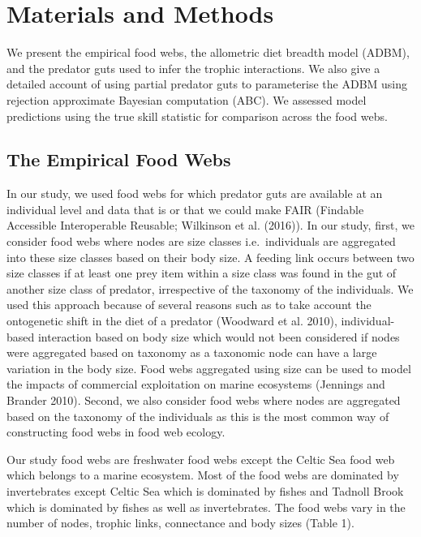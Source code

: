 \documentclass{article}
\begin{document}
\hypertarget{materials-and-methods}{%
\section{Materials and Methods}\label{materials-and-methods}}

We present the empirical food webs, the allometric diet breadth model
(ADBM), and the predator guts used to infer the trophic interactions. We
also give a detailed account of using partial predator guts to
parameterise the ADBM using rejection approximate Bayesian computation
(ABC). We assessed model predictions using the true skill statistic for
comparison across the food webs.

\hypertarget{the-empirical-food-webs}{%
\subsection{The Empirical Food Webs}\label{the-empirical-food-webs}}

In our study, we used food webs for which predator guts are available at
an individual level and data that is or that we could make FAIR
(Findable Accessible Interoperable Reusable; Wilkinson et al. (2016)).
In our study, first, we consider food webs where nodes are size classes
i.e.~individuals are aggregated into these size classes based on their
body size. A feeding link occurs between two size classes if at least
one prey item within a size class was found in the gut of another size
class of predator, irrespective of the taxonomy of the individuals. We
used this approach because of several reasons such as to take account
the ontogenetic shift in the diet of a predator (Woodward et al. 2010),
individual-based interaction based on body size which would not been
considered if nodes were aggregated based on taxonomy as a taxonomic
node can have a large variation in the body size. Food webs aggregated
using size can be used to model the impacts of commercial exploitation
on marine ecosystems (Jennings and Brander 2010). Second, we also
consider food webs where nodes are aggregated based on the taxonomy of
the individuals as this is the most common way of constructing food webs
in food web ecology.

Our study food webs are freshwater food webs except the Celtic Sea food
web which belongs to a marine ecosystem. Most of the food webs are
dominated by invertebrates except Celtic Sea which is dominated by
fishes and Tadnoll Brook which is dominated by fishes as well as
invertebrates. The food webs vary in the number of nodes, trophic links,
connectance and body sizes (Table 1).
\end{document}
